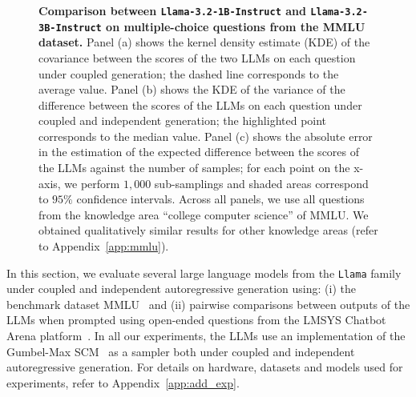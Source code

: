 \begin{figure}
    \centering
    \hspace{1mm}
    \hspace{1mm}
    \caption{\textbf{Comparison between \texttt{Llama-3.2-1B-Instruct} and \texttt{Llama-3.2-3B-Instruct} on multiple-choice questions from the MMLU dataset.}
    Panel (a) shows the kernel density estimate (KDE) of the covariance between the scores of the two LLMs on each question under coupled generation; the dashed line corresponds to the average value. Panel (b) shows the KDE of the variance of the difference between the scores of the LLMs on each question under coupled and independent generation; the highlighted point corresponds to the median value. Panel (c) shows the absolute error in the estimation of the expected difference between the scores of the LLMs against the number of samples; for each point on the x-axis, we perform $1{,}000$ sub-samplings and shaded areas correspond to $95\%$ confidence intervals. Across all panels, we use all questions from the knowledge area ``college computer science'' of MMLU. We obtained qualitatively similar results for other knowledge areas (refer to Appendix~\ref{app:mmlu}).}
    \label{fig:mmlu-1B-vs-3B-college-cs}
\end{figure}

In this section, we evaluate several large language models from the \texttt{Llama} family under coupled and independent autoregressive generation using: (i) the benchmark dataset MMLU~\cite{hendrycks2021measuring} and (ii) pairwise comparisons between outputs of the LLMs when prompted using open-ended questions from the LMSYS Chatbot Arena platform~\cite{lmsys2023chatbot}.
%
In all our experiments, the LLMs use an implementation of the Gumbel-Max SCM~\cite{chatzi2024counterfactual} as a sampler both under coupled and independent autoregressive generation.
%
For details on hardware, datasets and models used for experiments, refer to Appendix~\ref{app:add_exp}.

